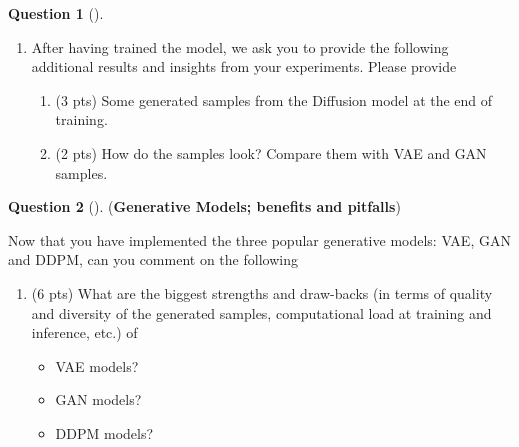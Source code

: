 \documentclass[12pt]{article}
\theoremstyle{definition}
\newtheorem{exercise}{Question}%
\begin{document}
\begin{exercise}[]
\begin{enumerate}
\begin{itemize}
        \item (2 pts) Complete the \texttt{p\_sample\_loop} function that uses \texttt{p\_sample} function and iteratively denoises completely random noise from $t=T$ to $t=1$.
        \item (5 pts) Implement the \texttt{p\_losses} function that generates some random noise, uses this random noise to get a noisy sample, gets its noise prediction, and then returns the \textbf{smoothed $L_1$ loss} between the predicted and true noise.
        \item (1 pts) Finally, implement the random sampling of time-steps in the function \texttt{t\_sample}.
    \end{itemize}
    \item After having trained the model, we ask you to provide the following additional results and insights from your experiments. Please provide
    \begin{enumerate}
        \item (3 pts) Some generated samples from the Diffusion model at the end of training.
        \item (2 pts) How do the samples look? Compare them with VAE and GAN samples.
    \end{enumerate}
\end{enumerate}
\end{exercise}
\begin{exercise}[] (\textbf{Generative Models; benefits and pitfalls})

Now that you have implemented the three popular generative models: VAE, GAN and DDPM, can you comment on the following
\begin{enumerate}
    \item (6 pts) What are the biggest strengths and draw-backs (in terms of quality and diversity of the generated samples, computational load at training and inference, etc.) of
    \begin{itemize}
        \item VAE models?
        \item GAN models?
        \item DDPM models?
    \end{itemize}
\end{enumerate}
\end{exercise}
\end{document}
